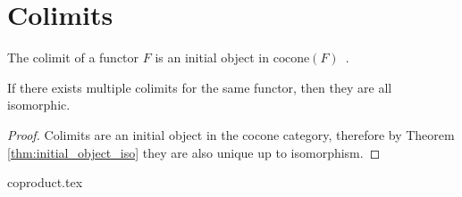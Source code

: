 \section{Colimits}

\begin{definition}[Colimit]
	The colimit of a functor $F$ is an initial object in
	$\mathrm{cocone}(F)$~\parencite[p.~126]{leinster:basic_category_theory}.
\end{definition}

\begin{theorem}\label{thm:colimit_iso}
	If there exists multiple colimits for the same functor, then they are all
	isomorphic.

	\begin{proof}
		Colimits are an initial object in the cocone category, therefore by Theorem
		\ref{thm:initial_object_iso} they are also unique up to isomorphism.
	\end{proof}
\end{theorem}

{coproduct.tex}



